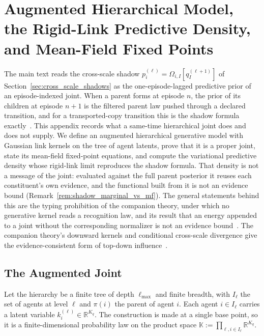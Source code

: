 \section{Augmented Hierarchical Model, the Rigid-Link Predictive Density, and Mean-Field Fixed Points}
\label{app:augmented_joint}

The main text reads the cross-scale shadow $p_i^{(\ell)} = \Omega_{i,I}[q_I^{(\ell+1)}]$ of Section~\ref{sec:cross_scale_shadows} as the one-episode-lagged predictive prior of an episode-indexed joint. When a parent forms at episode $n$, the prior of its children at episode $n+1$ is the filtered parent law pushed through a declared transition, and for a transported-copy transition this is the shadow formula exactly~\cite[Ch.~12]{DennisGaugeVFE2026}. This appendix records what a same-time hierarchical joint does and does not supply. We define an augmented hierarchical generative model with Gaussian link kernels on the tree of agent latents, prove that it is a proper joint, state its mean-field fixed-point equations, and compute the variational predictive density whose rigid-link limit reproduces the shadow formula. That density is not a message of the joint: evaluated against the full parent posterior it reuses each constituent's own evidence, and the functional built from it is not an evidence bound (Remark~\ref{rem:shadow_marginal_vs_mf}). The general statements behind this are the typing prohibition of the companion theory, under which no generative kernel reads a recognition law, and its result that an energy appended to a joint without the corresponding normalizer is not an evidence bound~\cite[Ch.~4]{DennisGaugeVFE2026}. The companion theory's downward kernels and conditional cross-scale divergence give the evidence-consistent form of top-down influence~\cite[Ch.~12]{DennisGaugeVFE2026}.

\subsection{The Augmented Joint}

Let the hierarchy be a finite tree of depth $\ell_{\max}$ and finite breadth, with $I_\ell$ the set of agents at level $\ell$ and $\pi(i)$ the parent of agent $i$. Each agent $i \in I_\ell$ carries a latent variable $k_i^{(\ell)} \in \mathbb{R}^{K_q}$. The construction is made at a single base point, so it is a finite-dimensional probability law on the product space $\mathbb{K} := \prod_{\ell, i \in I_\ell} \mathbb{R}^{K_q}$.


